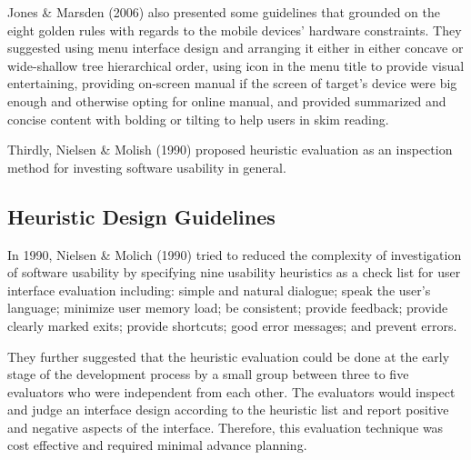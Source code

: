 Jones \& Marsden (2006) \cite{jones2006mobile}also presented some guidelines that grounded on the eight golden rules with regards to the mobile devices' hardware constraints. They suggested using menu interface design and arranging it either in either concave or wide-shallow tree hierarchical order, using icon in the menu title to provide visual entertaining, providing on-screen manual if the screen of target's device were big enough and otherwise opting for online manual, and provided summarized and concise content with bolding or tilting to help users in skim reading. 

Thirdly, Nielsen \& Molish (1990) \cite{nielsen1990heuristic} proposed heuristic evaluation as an inspection method for investing software usability in general. 



\subsection{Heuristic Design Guidelines}

In 1990, Nielsen \& Molich (1990) \cite{nielsen1990heuristic} tried to reduced the complexity of investigation of software usability by specifying nine usability heuristics as a check list for user interface evaluation including: simple and natural dialogue; speak the user's language; minimize user memory load; be consistent; provide feedback; provide clearly marked exits; provide shortcuts; good error messages; and prevent errors. 

They further suggested that the heuristic evaluation could be done at the early stage of the development process by a small group between three to five evaluators who were independent from each other. The evaluators would inspect and judge an interface design according to the heuristic list and report positive and negative aspects of the interface. Therefore, this evaluation technique was cost effective and required minimal advance planning. 

